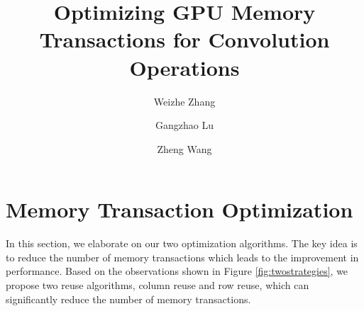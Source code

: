 \documentclass[sigplan,review,anonymous]{acmart}\settopmatter{printfolios=true,printccs=false,printacmref=false}
\begin{document}
\title{Optimizing GPU Memory Transactions for Convolution Operations}

\author{Weizhe Zhang}

\author{Gangzhao Lu}

\author{Zheng Wang}
 



\maketitle









\section{Memory Transaction Optimization}
\label{sec:strategies}
In this section, we elaborate on our two optimization algorithms. The key idea is to reduce the  number of memory transactions which leads to the improvement in performance. Based on the observations shown in Figure \ref{fig:twostrategies}, we propose two reuse algorithms, column reuse and row reuse, which can significantly reduce the number of memory transactions.
\end{document}
